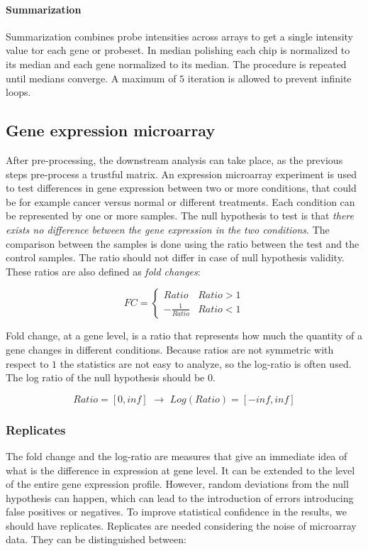 			\paragraph{Summarization}
			Summarization combines probe intensities across arrays to get a single intensity value tor each gene or probeset.
			In median polishing each chip is normalized to its median and each gene normalized to its median.
			The procedure is repeated until medians converge.
			A maximum of $5$ iteration is allowed to prevent infinite loops.

	\subsection{Gene expression microarray}
	After pre-processing, the downstream analysis can take place, as the previous steps pre-process a trustful matrix.
	An expression microarray experiment is used to test differences in gene expression between two or more conditions, that could be for example cancer versus normal or different treatments.
	Each condition can be represented by one or more samples.
	The null hypothesis to test is that \textit{there exists no difference between the gene expression in the two conditions}.
	The comparison between the samples is done using the ratio between the test and the control samples.
	The ratio should not differ in case of null hypothesis validity.
	These ratios are also defined as \textit{fold changes}:

	$$FC = \begin{cases}Ratio & Ratio>1\\-\frac{1}{Ratio} & Ratio <1\end{cases}$$

	Fold change, at a gene level, is a ratio that represents how much the quantity of a gene changes in different conditions.
	Because ratios are not symmetric with respect to $1$ the statistics are not easy to analyze, so the log-ratio is often used.
	The log ratio of the null hypothesis should be $0$.

	$$Ratio = [0, inf] \,\, \rightarrow \,\, Log(Ratio) = [-inf, inf]$$

		\subsubsection{Replicates}
		The fold change and the log-ratio are measures that give an immediate idea of what is the difference in expression at gene level.
		It can be extended to the level of the entire gene expression profile.
		However, random deviations from the null hypothesis can happen, which can lead to the introduction of errors introducing false positives or negatives.
		To improve statistical confidence in the results, we should have replicates.
		Replicates are needed considering the noise of microarray data.
		They can be distinguished between:


